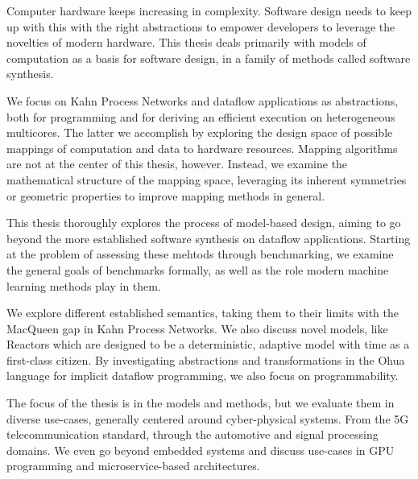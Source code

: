 Computer hardware keeps increasing in complexity.
Software design needs to keep up with this with the right abstractions to empower developers to leverage the novelties of modern hardware.
This thesis deals primarily with models of computation as a basis for software design, in a family of methods called software synthesis.

We focus on Kahn Process Networks and dataflow applications as abstractions, both for programming and for deriving an efficient execution on heterogeneous multicores.
The latter we accomplish by exploring the design space of possible mappings of computation and data to hardware resources.
Mapping algorithms are not at the center of this thesis, however.
Instead, we examine the mathematical structure of the mapping space, leveraging its inherent symmetries or geometric properties to improve mapping methods in general.

This thesis thoroughly explores the process of model-based design, aiming to go beyond the more established software synthesis on dataflow applications.
Starting at the problem of assessing these mehtods through benchmarking, we examine the general goals of benchmarks formally, as well as the role modern machine learning methods play in them.

We explore different established semantics, taking them to their limits with the MacQueen gap in Kahn Process Networks.
We also discuss novel models, like Reactors which are designed to be a deterministic, adaptive model with time as a first-class citizen.
By investigating abstractions and transformations in the Ohua language for implicit dataflow programming, we also focus on programmability.

The focus of the thesis is in the models and methods, but we evaluate them in diverse use-cases, generally centered around cyber-physical systems.
From the 5G telecommunication standard, through the automotive and signal processing domains.
We even go beyond embedded systems and discuss use-cases in \acs*{GPU} programming and microservice-based architectures.